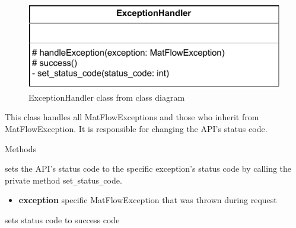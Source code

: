 
\begin{figure}[h]
        \centerline{\includegraphics[scale=1]{res/Klassen/ExceptionHandler.pdf}}
        \caption{ExceptionHandler class from class diagram}
\end{figure}

This class handles all MatFlowExceptions and those who inherit from MatFlowException. It is  
responsible for changing the API's status code.

\begin{methodenv}{Methods}

sets the API's status code to the specific exception's status code by calling the private method
set\texttt{\_}status\texttt{\_}code.
\begin{itemize}
        \item \textbf{exception}
        specific MatFlowException that was thrown during request
\end{itemize}

sets status code to success code

\end{methodenv}

